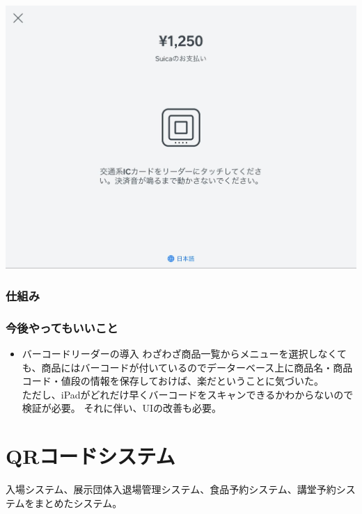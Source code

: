 \documentclass[a4paper]{ltjsreport}
\begin{document}
\begin{enumerate}
\begin{enumerate}
\begin{enumerate}
                        \includegraphics[scale=0.2]{assets/square_e-payment_scan.jpg}
                \end{enumerate}
        \end{enumerate}
\end{enumerate}
\subsubsection{仕組み}
\subsubsection{今後やってもいいこと}
\begin{itemize}
  \item バーコードリーダーの導入
        わざわざ商品一覧からメニューを選択しなくても、商品にはバーコードが付いているのでデーターベース上に商品名・商品コード・値段の情報を保存しておけば、楽だということに気づいた。\\
        ただし、iPadがどれだけ早くバーコードをスキャンできるかわからないので検証が必要。
        それに伴い、UIの改善も必要。
\end{itemize}

\newpage
\section{QRコードシステム}
入場システム、展示団体入退場管理システム、食品予約システム、講堂予約システムをまとめたシステム。
\end{document}
